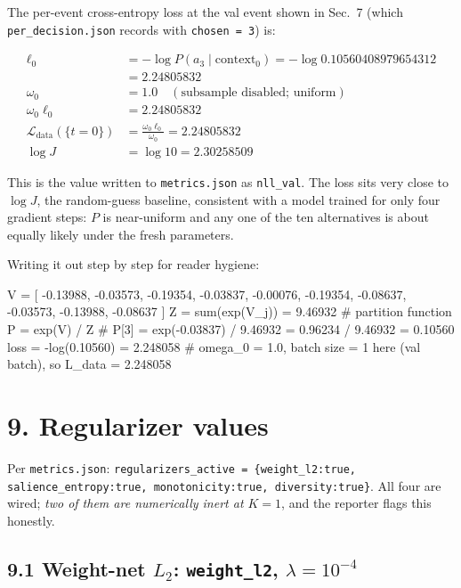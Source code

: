 \documentclass[11pt,a4paper]{article}
\begin{document}
The per-event cross-entropy loss at the val event shown in Sec.~7
(which \texttt{per\_decision.json} records with \texttt{chosen = 3})
is:

\begin{equation*}
\begin{aligned}
\ell_0 &= -\log P(a_3 \mid \text{context}_0)
     = -\log 0.10560408979654312 \\
     &= 2.24805832 \\
\omega_0 &= 1.0 \quad (\text{subsample disabled; uniform}) \\
\omega_0 \ell_0 &= 2.24805832 \\
\mathcal{L}_{\text{data}}(\{t = 0\}) &= \frac{\omega_0 \ell_0}{\omega_0}
                                   = 2.24805832 \\
\log J &= \log 10 = 2.30258509
\end{aligned}
\end{equation*}

This is the value written to \texttt{metrics.json} as
\texttt{nll\_val}. The loss sits very close to $\log J$, the
random-guess baseline, consistent with a model trained for only four
gradient steps: $P$ is near-uniform and any one of the ten alternatives
is about equally likely under the fresh parameters.

Writing it out step by step for reader hygiene:

\begin{code}
V = [ -0.13988, -0.03573, -0.19354, -0.03837, -0.00076,
      -0.19354, -0.08637, -0.03573, -0.13988, -0.08637 ]
Z = sum(exp(V_j)) = 9.46932     # partition function
P = exp(V) / Z
# P[3] = exp(-0.03837) / 9.46932 = 0.96234 / 9.46932 = 0.10560
loss = -log(0.10560) = 2.248058
# omega_0 = 1.0, batch size = 1 here (val batch), so L_data = 2.248058
\end{code}

\section*{9. Regularizer values}

Per \texttt{metrics.json}:
\texttt{regularizers\_active = \{weight\_l2:true,
salience\_entropy:true, monotonicity:true, diversity:true\}}. All four
are wired; \emph{two of them are numerically inert at $K = 1$}, and
the reporter flags this honestly.

\subsection*{9.1 Weight-net $L_2$: \texttt{weight\_l2},
$\lambda = 10^{-4}$}
\end{document}
